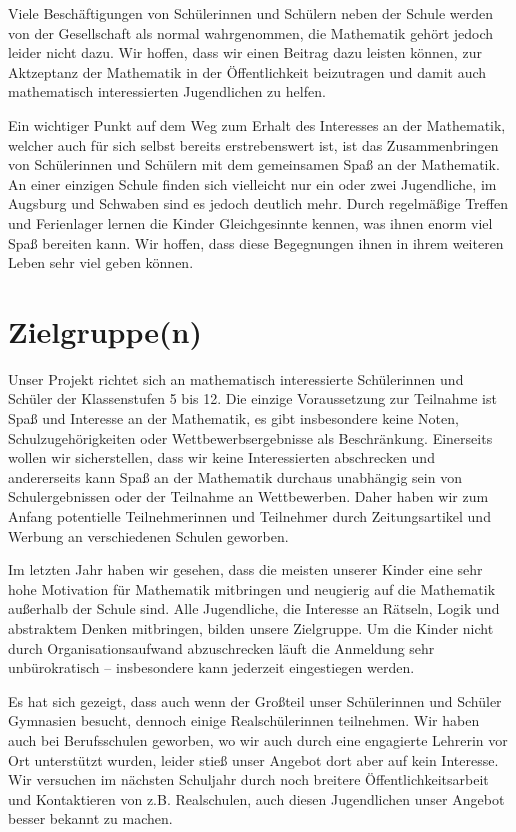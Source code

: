 \documentclass[12pt]{zettel}
\begin{document}
Viele Beschäftigungen von Schülerinnen und Schülern neben der Schule
werden von der Gesellschaft als normal wahrgenommen, die Mathematik
gehört jedoch leider nicht dazu. Wir hoffen, dass wir einen Beitrag dazu
leisten können, zur Aktzeptanz der Mathematik in der Öffentlichkeit
beizutragen und damit auch mathematisch interessierten Jugendlichen zu
helfen.

Ein wichtiger Punkt auf dem Weg zum Erhalt des Interesses an der
Mathematik, welcher auch für sich selbst bereits erstrebenswert ist, ist
das Zusammenbringen von Schülerinnen und Schülern mit dem gemeinsamen
Spaß an der Mathematik. An einer einzigen Schule finden sich vielleicht
nur ein oder zwei Jugendliche, im Augsburg und Schwaben sind es jedoch
deutlich mehr. Durch regelmäßige Treffen und Ferienlager lernen die
Kinder Gleichgesinnte kennen, was ihnen enorm viel Spaß bereiten kann.
Wir hoffen, dass diese Begegnungen ihnen in ihrem weiteren Leben sehr
viel geben können.


\section{Zielgruppe(n)}

Unser Projekt richtet sich an mathematisch interessierte Schülerinnen
und Schüler der Klassenstufen 5 bis 12. Die einzige Voraussetzung zur
Teilnahme ist Spaß und Interesse an der Mathematik, es gibt insbesondere
keine Noten, Schulzugehörigkeiten oder Wettbewerbsergebnisse als
Beschränkung. Einerseits wollen wir sicherstellen, dass wir keine
Interessierten abschrecken und andererseits kann Spaß an der Mathematik
durchaus unabhängig sein von Schulergebnissen oder der Teilnahme an
Wettbewerben. Daher haben wir zum Anfang potentielle Teilnehmerinnen und
Teilnehmer durch Zeitungsartikel und Werbung an verschiedenen Schulen
geworben.

Im letzten Jahr haben wir gesehen, dass die meisten unserer Kinder eine
sehr hohe Motivation für Mathematik mitbringen und neugierig auf die
Mathematik außerhalb der Schule sind. Alle Jugendliche, die Interesse an
Rätseln, Logik und abstraktem Denken mitbringen, bilden unsere
Zielgruppe. Um die Kinder nicht durch Organisationsaufwand abzuschrecken
läuft die Anmeldung sehr unbürokratisch -- insbesondere kann jederzeit
eingestiegen werden.

Es hat sich gezeigt, dass auch wenn der Großteil unser Schülerinnen und
Schüler Gymnasien besucht, dennoch einige Realschülerinnen teilnehmen.
Wir haben auch bei Berufsschulen geworben, wo wir auch durch eine
engagierte Lehrerin vor Ort unterstützt wurden, leider stieß unser
Angebot dort aber auf kein Interesse. Wir versuchen im nächsten
Schuljahr durch noch breitere Öffentlichkeitsarbeit und Kontaktieren von
z.B. Realschulen, auch diesen Jugendlichen unser Angebot besser bekannt
zu machen.
\end{document}
